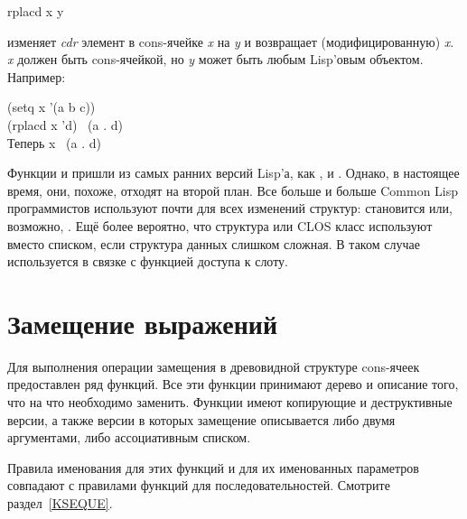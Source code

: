 \begin{defun}[Функция]
rplacd x y

 изменяет \emph{cdr} элемент в cons-ячейке
\emph{x} на \emph{y} и возвращает (модифицированную) \emph{x}. \emph{x} должен
быть cons-ячейкой, но \emph{y} может быть любым Lisp'овым объектом.
Например:
\begin{lisp}
(setq x '(a b c)) \\
(rplacd x 'd) \EV\ (a . d) \\
\textrm{Теперь} x \EV\ (a . d)
\end{lisp}
\end{defun}

Функции  и  пришли из самых ранних версий Lisp'а, как
,  и .
Однако, в настоящее время, они, похоже, отходят на второй план.
Все больше и больше Common Lisp программистов используют  почти
для всех изменений структур:  становится
 или, возможно, .
Ещё более вероятно, что структура  или CLOS класс используют
вместо списком, если структура данных слишком сложная.
В таком случае  используется в связке с функцией доступа к слоту.

\section{Замещение выражений}

Для выполнения операции замещения в древовидной структуре cons-ячеек
предоставлен ряд функций. Все эти функции принимают дерево и описание того, что
на что необходимо заменить. Функции имеют копирующие и деструктивные версии, а
также версии в которых замещение описывается либо двумя аргументами, либо
ассоциативным списком.

Правила именования для этих функций и для их именованных параметров совпадают с
правилами функций для последовательностей. Смотрите раздел~\ref{KSEQUE}.

